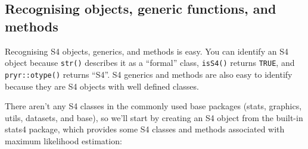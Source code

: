 \subsection{Recognising objects, generic functions, and methods}

Recognising S4 objects, generics, and methods is easy. You can identify
an S4 object because \texttt{str()} describes it as a ``formal'' class,
\texttt{isS4()} returns \texttt{TRUE}, and \texttt{pryr::otype()}
returns ``S4''. S4 generics and methods are also easy to identify
because they are S4 objects with well defined classes.

There aren't any S4 classes in the commonly used base packages (stats,
graphics, utils, datasets, and base), so we'll start by creating an S4
object from the built-in stats4 package, which provides some S4 classes
and methods associated with maximum likelihood estimation:

\begin{Shaded}
\begin{Highlighting}[]

\StringTok{ }\NormalTok{(}\NormalTok{, }\NormalTok{, }\NormalTok{, }\NormalTok{, }\NormalTok{, }\NormalTok{, }\NormalTok{, }\NormalTok{, }\NormalTok{, }\NormalTok{, }\NormalTok{)}
\StringTok{ }\StringTok{ }\NormalTok{(} \NormalTok{))}
\StringTok{ } \NormalTok{(} \NormalTok{), } 



\StringTok{ }\NormalTok{(}
\end{Highlighting}
\end{Shaded}

